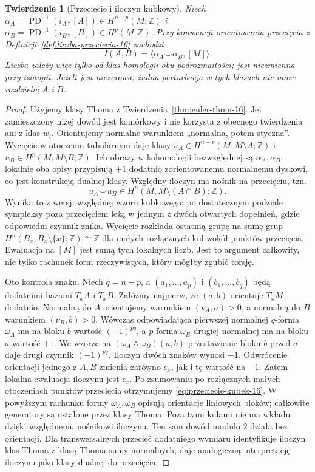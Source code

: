 \documentclass[11pt,a4paper,oneside]{report}
\newcommand{\Z}{\mathbb{Z}}
\theoremstyle{plain}
\newtheorem{twierdzenie}{Twierdzenie}[section]
\theoremstyle{definition}
\theoremstyle{remark}
\begin{document}
\begin{twierdzenie}[Przecięcie i iloczyn kubkowy]
\label{thm:przeciecie-kubek-16}
Niech $\alpha_A=\operatorname{PD}^{-1}
(i_{A*}[A])\in H^{n-p}(M;\Z)$
i $\alpha_B=\operatorname{PD}^{-1}
(i_{B*}[B])\in H^p(M;\Z)$.
Przy konwencji orientowania przecięcia
z Definicji~\ref{def:liczba-przeciecia-16}
zachodzi
\begin{equation}\label{eq:przeciecie-kubek-16}
 I(A,B)=
 \langle\alpha_A\smile\alpha_B,[M]\rangle.
\end{equation}
Liczba zależy więc tylko od klas
homologii obu podrozmaitości;
jest niezmienna przy izotopii.
Jeżeli jest niezerowa, żadna
perturbacja w tych klasach nie
może rozdzielić $A$ i $B$.
\end{twierdzenie}
\begin{proof}
Użyjemy klasy Thoma z Twierdzenia~\ref{thm:euler-thom-16}.
Jej zamieszczony niżej dowód jest komórkowy i nie
korzysta z obecnego twierdzenia ani z klas $w_i$.
Orientujemy normalne warunkiem „normalna, potem styczna”.
Wycięcie w otoczeniu tubularnym daje klasy
$u_A\in H^{n-p}(M,M\setminus A;\Z)$ i
$u_B\in H^p(M,M\setminus B;\Z)$.
Ich obrazy w kohomologii bezwzględnej są $\alpha_A,\alpha_B$:
lokalnie oba opisy przypisują $+1$ dodatnio zorientowanemu
normalnemu dyskowi, co jest konstrukcją dualnej klasy.
Względny iloczyn ma nośnik na przecięciu, tzn.
\[
 u_A\smile u_B\in H^n(M,M\setminus(A\cap B);\Z).
\]
Wynika to z wersji względnej wzoru kubkowego:
po dostatecznym podziale sympleksy poza przecięciem
leżą w jednym z dwóch otwartych dopełnień,
gdzie odpowiedni czynnik znika.
Wycięcie rozkłada ostatnią grupę na sumę grup
$H^n(B_x,B_x\setminus\{x\};\Z)\cong\Z$
dla małych rozłącznych kul wokół punktów przecięcia.
Ewaluacja na $[M]$ jest sumą tych lokalnych liczb.
Jest to argument całkowity, nie tylko rachunek form
rzeczywistych, który mógłby zgubić torsję.

Oto kontrola znaku.
Niech $q=n-p$, a
$(a_1,\ldots,a_p)$
i $(b_1,\ldots,b_q)$
będą dodatnimi
bazami $T_xA$ i $T_xB$.
Załóżmy najpierw,
że $(a,b)$ orientuje
$T_xM$ dodatnio.
Normalną do $A$
orientujemy warunkiem
$(\nu_A,a)>0$,
a normalną do $B$
warunkiem
$(\nu_B,b)>0$.
Wówczas odpowiadająca
pierwszej normalnej
$q$-forma $\omega_A$
ma na bloku $b$
wartość $(-1)^{pq}$,
a $p$-forma $\omega_B$
drugiej normalnej
ma na bloku $a$
wartość $+1$.
We wzorze na
$(\omega_A\wedge\omega_B)(a,b)$
przestawienie bloku
$b$ przed $a$
daje drugi czynnik
$(-1)^{pq}$.
Iloczyn dwóch znaków
wynosi $+1$.
Odwrócenie orientacji
jednego z $A,B$
zmienia zarówno
$\epsilon_x$, jak
i tę wartość na $-1$.
Zatem lokalna ewaluacja
iloczynu jest $\epsilon_x$.
Po zsumowaniu po rozłącznych
małych otoczeniach punktów
przecięcia otrzymujemy
\eqref{eq:przeciecie-kubek-16}.
W powyższym rachunku formy $\omega_A,\omega_B$
opisują orientacje liniowych bloków; całkowite
generatory są ustalone przez klasy Thoma.
Poza tymi kulami nie ma wkładu dzięki względnemu
nośnikowi iloczynu. Ten sam dowód modulo $2$
działa bez orientacji. Dla transwersalnych przecięć
dodatniego wymiaru identyfikuje iloczyn klas Thoma
z klasą Thoma sumy normalnych; daje analogiczną
interpretację iloczynu jako klasy dualnej do przecięcia.


\end{proof}
\end{document}
